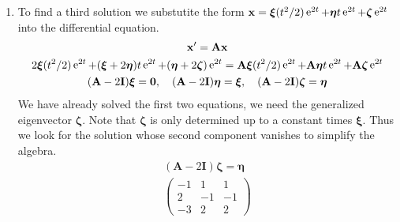 {\begin{Solution}
\begin{enumerate}
\begin{enumerate}
\begin{gather*}
\begin{pmatrix}
          0 \\
          1
        \end{pmatrix}
      \end{gather*}
      A second linearly independent solution is
      \[
      \boxed{
        \mathbf{x}^{(2)} =   
        \begin{pmatrix}
          0 \\
          1 \\
          -1
        \end{pmatrix}
        t \e^{2 t} + 
        \begin{pmatrix}
          1 \\
          0 \\
          1
        \end{pmatrix}
        \e^{2 t}.
        }
      \]
    \item
      To find a third solution we substutite the form 
      $\mathbf{x} = \boldsymbol{\xi} (t^2/2) \mathop{\mathrm{e}}\nolimits^{2 t} + \boldsymbol{\eta} t \mathop{\mathrm{e}}\nolimits^{2 t} + \boldsymbol{\zeta} \mathop{\mathrm{e}}\nolimits^{2 t}$
      into the differential equation.
      \begin{gather*}
        \mathbf{x}' = \mathbf{A} \mathbf{x} \\
        2 \boldsymbol{\xi} (t^2 / 2) \mathop{\mathrm{e}}\nolimits^{2 t} + (\boldsymbol{\xi} + 2 \boldsymbol{\eta}) t \mathop{\mathrm{e}}\nolimits^{2 t} 
        + (\boldsymbol{\eta} + 2 \boldsymbol{\zeta}) \mathop{\mathrm{e}}\nolimits^{2 t} 
        = \mathbf{A} \boldsymbol{\xi} (t^2/2) \mathop{\mathrm{e}}\nolimits^{2 t} + \mathbf{A} \boldsymbol{\eta} t \mathop{\mathrm{e}}\nolimits^{2 t} + \mathbf{A} \boldsymbol{\zeta} \mathop{\mathrm{e}}\nolimits^{2 t} \\
        (\mathbf{A} - 2 \mathbf{I}) \boldsymbol{\xi} = \mathbf{0}, \quad 
        (\mathbf{A} - 2 \mathbf{I}) \boldsymbol{\eta} = \boldsymbol{\xi}, \quad
        (\mathbf{A} - 2 \mathbf{I}) \boldsymbol{\zeta} = \boldsymbol{\eta}
      \end{gather*}
      We have already solved the first two equations, we need the generalized
      eigenvector $\boldsymbol{\zeta}$.  Note that $\boldsymbol{\zeta}$ is only determined up to a 
      constant times $\boldsymbol{\xi}$.  Thus we look for the solution whose second component 
      vanishes to simplify the algebra.
      \begin{gather*}
        (\mathbf{A} - 2 \mathbf{I}) \boldsymbol{\zeta} = \boldsymbol{\eta} \\
        \begin{pmatrix}
          -1 & 1 & 1\\
          2 & -1 & -1\\
          -3 & 2 & 2

\end{pmatrix}
\end{gather*}
\end{enumerate}
\end{enumerate}
\end{Solution}}
